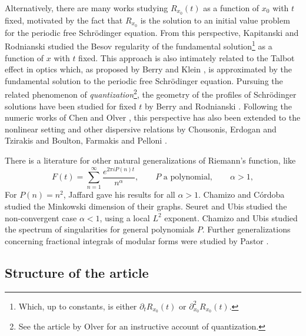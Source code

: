 \documentclass[11pt,reqno]{amsart}
\theoremstyle{definition}
\begin{document}
Alternatively, 
there are many works studying $R_{x_0}(t)$ as a function of $x_0$ with $t$ fixed,
motivated by the fact that $R_{x_0}$ is the solution to an initial value problem for the periodic free Schr\"odinger equation. 
From this perspective, 
Kapitanski and Rodnianski \cite{KapitanskiRodnianski1999} studied the Besov regularity of the fundamental solution\footnote{
Which, up to constants, is either $\partial_t R_{x_0}(t)$ or $\partial_{x_0}^2R_{x_0}(t)$.} as a function of $x$ with $t$ fixed. 
This approach is also intimately related to the Talbot effect in optics which, 
as proposed by Berry and Klein \cite{BerryKlein1996}, 
is approximated by the fundamental solution to the periodic free Schr\"odinger equation. 
Pursuing the related phenomenon of \textit{quantization}\footnote{See the article by Olver \cite{Olver2010} for an instructive account of quantization.},
the geometry of the profiles of Schr\"odinger solutions have been studied for fixed $t$ by Berry \cite{Berry1996} and Rodnianski \cite{Rodnianski2000}.
Following the numeric works of Chen and Olver \cite{ChenOlver2013,ChenOlver2014},
this perspective has also been extended to the nonlinear setting and other dispersive relations 
by Chousonis, Erdogan and Tzirakis \cite{ErdoganTzirakis2013,ChousionisErdoganTzirakis2015} 
and Boulton, Farmakis and Pelloni \cite{BoultonFarmakisPelloni2021,BoultonFarmakisPelloni2023}.


There is a literature for other natural generalizations of Riemann's function, like
\begin{equation}
F(t) = \sum_{n=1}^\infty \frac{e^{2\pi i P(n) t}}{n^\alpha}, 
\qquad P \text{ a polynomial}, 
\qquad \alpha > 1, 
\end{equation}
For $P(n) = n^2$, 
Jaffard \cite{Jaffard1996} gave his results for all $\alpha > 1$. 
Chamizo and C\'ordoba \cite{ChamizoCordoba1999} studied the Minkowski dimension of their graphs. 
Seuret and Ubis \cite{SeuretUbis2017} studied the non-convergent case $\alpha < 1$, 
using a local $L^2$ exponent.  
Chamizo and Ubis \cite{ChamizoUbis2007,ChamizoUbis2014} 
 studied the spectrum of singularities for general polynomials $P$.
 Further generalizations concerning fractional integrals of modular forms were studied by Pastor \cite{Pastor2019}. 


\subsection{Structure of the article}\label{sec:Structure}
\end{document}
